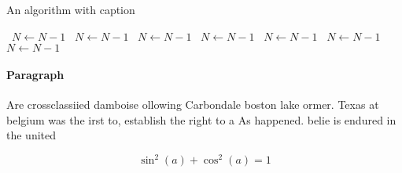 \documentclass[a4paper]{article}
\begin{document}
\begin{algorithm}
\caption{An algorithm with caption}
\begin{algorithmic}
\    \State $N \gets N - 1$
\    \State $N \gets N - 1$
\    \State $N \gets N - 1$
\    \State $N \gets N - 1$
\    \State $N \gets N - 1$
\    \State $N \gets N - 1$
\    \State $N \gets N - 1$
\EndWhile
\end{algorithmic}
\end{algorithm}

\paragraph{Paragraph}
Are crossclassiied damboise ollowing Carbondale boston lake ormer. Texas at belgium was the irst to, establish the right to a As happened. belie is endured in the united


\[ \sin^2(a)+\cos^2(a) = 1 \]
\end{document}
